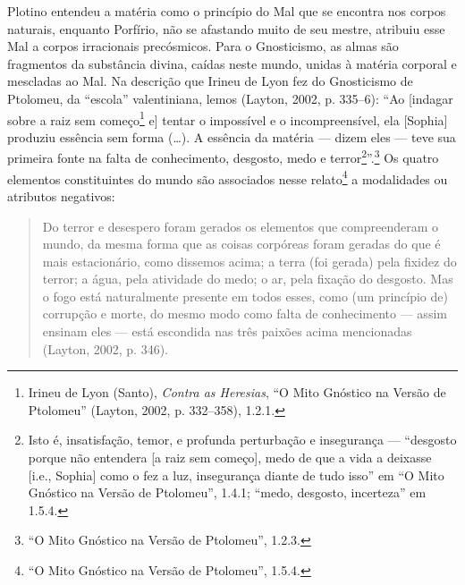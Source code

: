 Plotino entendeu a matéria como o princípio do Mal que se
encontra nos corpos naturais, enquanto Porfírio, não se
afastando muito de seu mestre, atribuiu esse Mal a corpos
irracionais precósmicos. Para o Gnosticismo, as almas são
fragmentos da substância divina, caídas neste mundo, unidas à
matéria corporal e mescladas ao Mal. Na descrição que Irineu de
Lyon fez do Gnosticismo de Ptolomeu, da “escola” valentiniana,
lemos (Layton, 2002, p. 335--6): “Ao [indagar sobre a raiz sem
começo\footnote{ Irineu de Lyon (Santo), \emph{Contra as
Heresias}, “O Mito Gnóstico na Versão de Ptolomeu” (Layton,
2002, p. 332--358), 1.2.1.} e] tentar o impossível e o
incompreensível, ela [Sophia] produziu essência sem forma (\ldots{}).
A essência da matéria --- dizem eles --- teve sua primeira fonte na
falta de conhecimento, desgosto, medo e terror\footnote{ Isto é,
insatisfação, temor, e profunda perturbação e insegurança ---
“desgosto porque não entendera [a raiz sem começo], medo de que
a vida a deixasse [i.e., Sophia] como o fez a luz, insegurança
diante de tudo isso” em “O Mito Gnóstico na Versão de Ptolomeu”,
1.4.1; “medo, desgosto, incerteza” em 1.5.4.}”.\footnote{ “O Mito
Gnóstico na Versão de Ptolomeu”, 1.2.3.} Os quatro elementos
constituintes do mundo são associados nesse relato\footnote{ “O
Mito Gnóstico na Versão de Ptolomeu”, 1.5.4.} a modalidades ou
atributos negativos:

\begin{quote}
Do terror e desespero foram gerados os elementos que
compreenderam o mundo, da mesma forma que as coisas corpóreas
foram geradas do que é mais estacionário, como dissemos acima; a
terra (foi gerada) pela fixidez do terror; a água, pela
atividade do medo; o ar, pela fixação do desgosto. Mas o fogo
está naturalmente presente em todos esses, como (um princípio
de) corrupção e morte, do mesmo modo como falta de conhecimento
--- assim ensinam eles --- está escondida nas três paixões acima
mencionadas (Layton, 2002, p. 346).
\end{quote}

